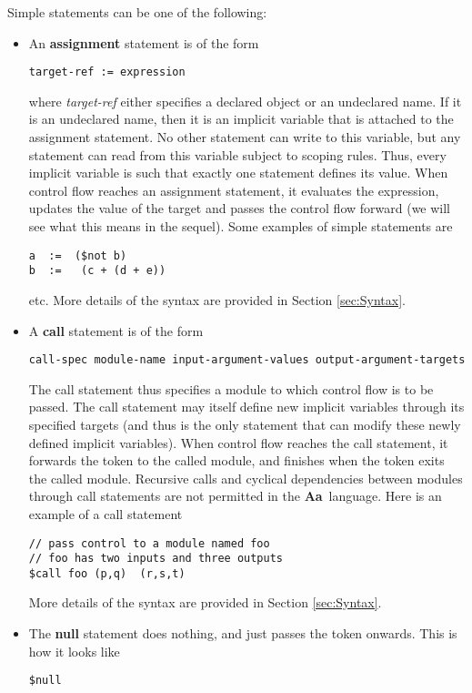 \documentclass{article}
\newcommand{\Aa}{{\bf Aa}~}
\begin{document}
Simple statements can be one of the following:
\begin{itemize}
\item An {\bf assignment} statement is of the form
\begin{verbatim}
target-ref := expression
\end{verbatim}
where {\em target-ref} either specifies a declared object
or an undeclared name.  If it is an undeclared name, then
it is an implicit variable that is attached to the
assignment statement.  No other statement can write to this
variable, but any statement can read from this variable
subject to scoping rules.  Thus, every implicit variable
is such that exactly one statement defines its value.
When control flow reaches an assignment statement, it
evaluates the expression, updates the value of the target
and passes the control flow forward (we will see what this
means in the sequel).
Some examples of simple statements are 
\begin{verbatim}
a  :=  ($not b)
b  :=   (c + (d + e))
\end{verbatim}
etc.  
More details of the syntax are provided in 
Section \ref{sec:Syntax}.
\item A {\bf call} statement is of the form
\begin{verbatim}
call-spec module-name input-argument-values output-argument-targets
\end{verbatim}
The call statement thus specifies a module to which control flow
is to be passed.  The call statement may itself define new implicit
variables through its specified targets (and thus is the only
statement that can modify these newly defined implicit variables).
When control flow reaches the call statement, it forwards the
token to the called module, and finishes when the token exits
the called module.  Recursive calls and cyclical dependencies between
modules through call statements are not permitted in the \Aa language.
Here is an example of a call statement
\begin{verbatim}
// pass control to a module named foo
// foo has two inputs and three outputs
$call foo (p,q)  (r,s,t)
\end{verbatim}
More details of the syntax are provided in 
Section \ref{sec:Syntax}.
\item The {\bf null} statement does nothing, and just passes the
token onwards.  This is how it looks like
\begin{verbatim}
$null
\end{verbatim}
\end{itemize}
\end{document}
